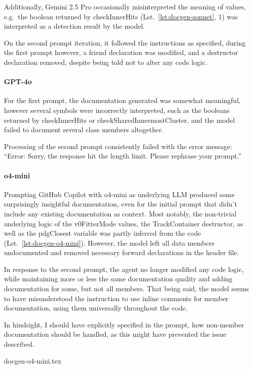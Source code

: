 Additionally, Gemini 2.5 Pro occasionally misinterpreted the meaning of values, e.g.\ the boolean returned by checkInnerHits (Lst.\ \ref{lst:docgen-sonnet}, 1) was interpreted as a detection result by the model.

On the second prompt iteration, it followed the instructions as specified, during the first prompt however, a friend declaration was modified, and a destructor declaration removed, despite being told not to alter any code logic.

\paragraph{GPT-4o}
For the first prompt, the documentation generated was somewhat meaningful, however several symbols were incorrectly interpreted, such as the booleans returned by checkInnerHits or checkSharedInnermostCluster,
and the model failed to document several class members altogether.

Processing of the second prompt consistently failed with the error message: \enquote{Error: Sorry, the response hit the length limit. Please rephrase your prompt.}

\paragraph{o4-mini}
Prompting GitHub Copilot with o4-mini as underlying LLM produced some surprisingly insightful documentation, even for the initial prompt that didn't include any existing documentation as context.
Most notably, the non-trivial underlying logic of the v0FitterMode values, the TrackContainer destructor, as well as the pdgClosest variable was partly inferred from the code (Lst.\ \ref{lst:docgen-o4-mini}).
However, the model left all data members undocumented and removed necessary forward declarations in the header file.

In response to the second prompt, the agent no longer modified any code logic, while maintaining more or less the same documentation quality and adding documentation for some, but not all members.
That being said, the model seems to have misunderstood the instruction to use inline comments for member documentation, using them universally throughout the code.

In hindsight, I should have explicitly specified in the prompt, how non-member documentation should be handled, as this might have prevented the issue described.

\begin{lstbox}{%
    \label{lst:docgen-o4-mini}
  }
  {docgen-o4-mini.tex}
\end{lstbox}

